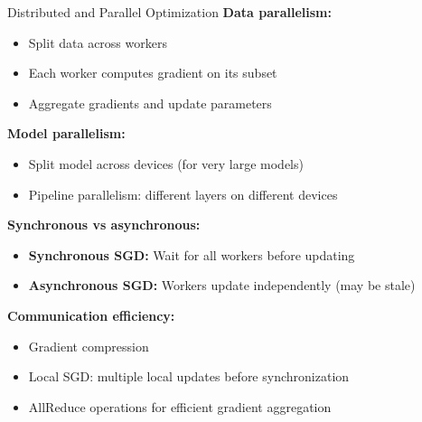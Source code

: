 \documentclass[aspectratio=169]{beamer}
\begin{document}
\begin{frame}{Distributed and Parallel Optimization}
  \textbf{Data parallelism:}
  \begin{itemize}
    \item Split data across workers
    \item Each worker computes gradient on its subset
    \item Aggregate gradients and update parameters
  \end{itemize}

  \vspace{0.5em}

  \textbf{Model parallelism:}
  \begin{itemize}
    \item Split model across devices (for very large models)
    \item Pipeline parallelism: different layers on different devices
  \end{itemize}

  \vspace{0.5em}

  \textbf{Synchronous vs asynchronous:}
  \begin{itemize}
    \item \textbf{Synchronous SGD:} Wait for all workers before updating
    \item \textbf{Asynchronous SGD:} Workers update independently (may be stale)
  \end{itemize}

  \vspace{0.5em}

  \textbf{Communication efficiency:}
  \begin{itemize}
    \item Gradient compression
    \item Local SGD: multiple local updates before synchronization
    \item AllReduce operations for efficient gradient aggregation
  \end{itemize}
\end{frame}
\end{document}
